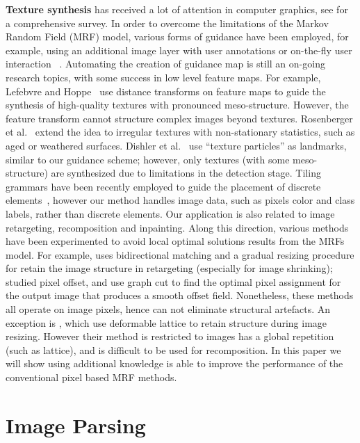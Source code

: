 \documentclass{acmtog}
\begin{document}
\textbf{Texture synthesis} has received a lot of attention in computer graphics, see \cite{Wei2009STAR} for a comprehensive survey. In order to overcome the limitations of the Markov Random Field (MRF) model, various forms of guidance have been employed, for example, using an additional image layer with user annotations \cite{Hertzmann2001IA} or on-the-fly user interaction ~\cite{Barnes2009,Hu2013PPI}. Automating the creation of guidance map is still an on-going research topics, with some success in low level feature maps. For example, Lefebvre and Hoppe~ use distance transforms on feature maps to guide the synthesis of high-quality textures with pronounced meso-structure. However, the feature transform cannot structure complex images beyond textures. Rosenberger et al.~ extend the idea to irregular textures with non-stationary statistics, such as aged or weathered surfaces. Dishler et al.~ use ``texture particles'' as landmarks, similar to our guidance scheme; however, only textures (with some meso-structure) are synthesized due to limitations in the detection stage. Tiling grammars have been recently employed to guide the placement of discrete elements~\cite{Ma2011DET,Ma2013DET}, however our method handles image data, such as pixels color and class labels, rather than discrete elements. Our application is also related to image retargeting, recomposition and inpainting. Along this direction, various methods have been experimented to avoid local optimal solutions results from the MRFs model. For example, \cite{Simakov2008SV} uses bidirectional matching and a gradual resizing procedure for retain the image structure in retargeting (especially for image shrinking); \cite{Pritch09ICCV,He2012PO} studied pixel offset, and use graph cut to find the optimal pixel assignment for the output image that produces a smooth offset field. Nonetheless, these methods all operate on image pixels, hence can not eliminate structural artefacts. An exception is \cite{Wu2010SS}, which use deformable lattice to retain structure during image resizing. However their method is restricted to images has a global repetition (such as lattice), and is difficult to be used for recomposition. In this paper we will show using additional  knowledge is able to improve the performance of the conventional pixel based MRF methods. 

\section{Image Parsing}
\label{sec:ImageParsing}
\end{document}
